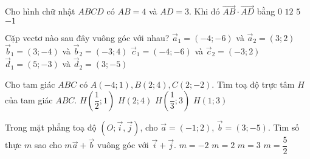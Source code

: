 \begin{ex}%
	Cho hình chữ nhật $ABCD$ có $AB = 4$ và $AD = 3$. Khi đó $\overrightarrow{AB}\cdot \overrightarrow{AD}$ bằng
	\choice
	{\True $0$}
	{$12$}
	{$5$}
	{$-1$}
\end{ex}

\begin{ex}%
	Cặp vectơ nào sau đây vuông góc với nhau?
	\choice
	{$\overrightarrow{a}_1=(-4;-6)$ và $\overrightarrow{a}_2=(3;2)$}
	{$\overrightarrow{b}_1=(3;-4)$ và $\overrightarrow{b}_2=(-3;4)$}
	{\True $\overrightarrow{c}_1=(-4;-6)$ và $\overrightarrow{c}_2=(-3;2)$}
	{$\overrightarrow{d}_1=(5;-3)$ và $\overrightarrow{d}_2=(3;-5)$}
\end{ex}

\begin{ex}%
	Cho tam giác $ABC$ có $A(-4;1), B(2;4),C(2;-2)$. Tìm toạ độ trực tâm $H$ của tam giác $ABC$.
	\choice
	{\True $H\left(\dfrac{1}{2};1\right)$}
	{$H(2;4)$}
	{$H\left(\dfrac{1}{3};3\right)$}
	{$H(1;3)$}
\end{ex}

\begin{ex}%
	Trong mặt phẳng toạ độ $\left(O; \overrightarrow{i}, \overrightarrow{j}\right)$, cho $\overrightarrow{a}=(-1;2)$, $\overrightarrow{b}=(3;-5)$. Tìm số thực $m$ sao cho $m\overrightarrow{a}+\overrightarrow{b}$ vuông góc với $\overrightarrow{i}+\overrightarrow{j}$.
	\choice
	{$m=-2$}
	{\True $m=2$}
	{$m=3$}
	{$m=\dfrac{5}{2}$}
\end{ex}

